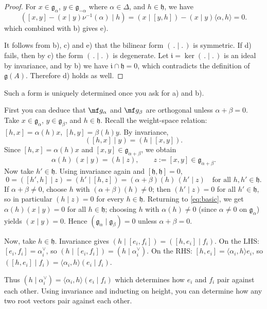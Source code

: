 \documentclass[12pt]{article}
\begin{document}
\begin{proof}
    For $x \in \mathfrak{g}_\alpha$, $y \in \mathfrak{g}_{-\alpha}$ where $\alpha \in \Delta$, and $h \in \mathfrak{h}$, we have
    \[
        ([x,y] - (x \mid y)\nu^{-1}(\alpha) \mid h)
        = (x \mid [y,h]) - (x \mid y)\langle \alpha,h\rangle = 0.
    \]
    which combined with b) gives e).

    It follows from b), c) and e) that the bilinear form $(\,.\mid.\,)$ is symmetric. If d) fails, then by c) the form $(\,.\mid.\,)$ is degenerate. Let $\mathfrak{i} = \ker(\,.\mid.\,)$ is an ideal by invariance, and by b) we have $\mathfrak{i}\cap \mathfrak{h}=0$, which contradicts the definition of $\mathfrak{g}(A)$. Therefore d) holds as well.
\end{proof}

\begin{remark}
    Such a form is uniquely determined once you ask for a) and b).

    First you can deduce that $\mf g_\alpha$ and $\mf g_\beta$ are orthogonal unless $\alpha+\beta=0$.
    Take $x \in \mathfrak{g}_\alpha$, $y \in \mathfrak{g}_\beta$, and $h \in \mathfrak{h}$. Recall the weight-space relation:
    $[h, x] = \alpha(h)x$, $[h,y] = \beta(h)y$. By invariance,
    \[
        ([h,x]\mid y)=(h\mid [x,y]).
    \]
    Since $[h,x]=\alpha(h)x$ and $[x,y]\in\mathfrak{g}_{\alpha+\beta}$, we obtain
    \begin{equation}\label{eq:basic}
        \alpha(h)\,(x\mid y)=(h\mid z),\qquad z:=[x,y]\in\mathfrak{g}_{\alpha+\beta}.
    \end{equation}
    Now take $h'\in\mathfrak{h}$. Using invariance again and $[\mathfrak{h},\mathfrak{h}]=0$,
    \[
        0=([h',h]\mid z)=(h'\mid [h,z])=(\alpha+\beta)(h)\,(h'\mid z)\quad\text{for all }h,h'\in\mathfrak{h}.
    \]
    If $\alpha+\beta\neq 0$, choose $h$ with $(\alpha+\beta)(h)\neq 0$; then $(h'\mid z)=0$ for all
    $h'\in\mathfrak{h}$, so in particular $(h\mid z)=0$ for every $h\in\mathfrak{h}$. Returning to
    \eqref{eq:basic}, we get $\alpha(h)(x\mid y)=0$ for all $h\in\mathfrak{h}$; choosing $h$ with
    $\alpha(h)\neq 0$ (since $\alpha\neq 0$ on $\mathfrak{g}_\alpha$) yields $(x\mid y)=0$.
    Hence $(\mathfrak{g}_\alpha\mid\mathfrak{g}_\beta)=0$ unless $\alpha+\beta=0$.


    Now, take $h \in \mathfrak{h}$. Invariance gives $(h \mid [e_i, f_i]) = ([h, e_i] \mid f_i)$.
    On the LHS: $[e_i, f_i] = \alpha_i^\vee$, so $(h \mid [e_i, f_i]) = (h \mid \alpha_i^\vee)$. On the RHS: $[h, e_i] = \langle \alpha_i, h \rangle e_i$, so
    $([h, e_i] \mid f_i) = \langle \alpha_i, h \rangle (e_i \mid f_i)$.

    Thus $(h \mid \alpha_i^\vee) = \langle \alpha_i, h \rangle (e_i \mid f_i)$ which determines how $e_i$ and $f_i$ pair against each other. Using invariance and inducting on height, you can determine how any two root vectors pair against each other.
\end{remark}
\end{document}

